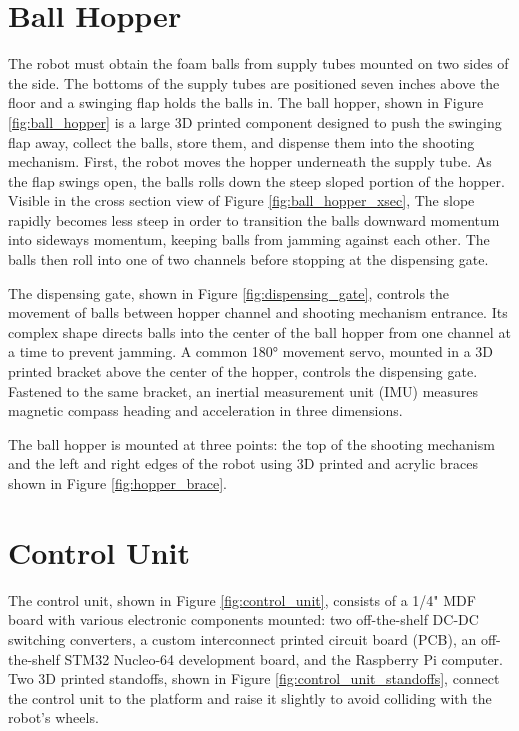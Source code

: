 \section{Ball Hopper}
The robot must obtain the foam balls from supply tubes mounted on two sides of the side. The bottoms of the supply tubes are positioned seven inches above the floor and a swinging flap holds the balls in. The ball hopper, shown in Figure \ref{fig:ball_hopper} is a large 3D printed component designed to push the swinging flap away, collect the balls, store them, and dispense them into the shooting mechanism. First, the robot moves the hopper underneath the supply tube. As the flap swings open, the balls rolls down the steep sloped portion of the hopper. Visible in the cross section view of Figure \ref{fig:ball_hopper_xsec}, The slope rapidly becomes less steep in order to transition the balls downward momentum into sideways momentum, keeping balls from jamming against each other. The balls then roll into one of two channels before stopping at the dispensing gate.

The dispensing gate, shown in Figure \ref{fig:dispensing_gate}, controls the movement of balls between hopper channel and shooting mechanism entrance. Its complex shape directs balls into the center of the ball hopper from one channel at a time to prevent jamming. A common \ang{180} movement servo, mounted in a 3D printed bracket above the center of the hopper, controls the dispensing gate. Fastened to the same bracket, an inertial measurement unit (IMU) measures magnetic compass heading and acceleration in three dimensions. 

The ball hopper is mounted at three points: the top of the shooting mechanism and the left and right edges of the robot using 3D printed and acrylic braces shown in Figure \ref{fig:hopper_brace}. 

\section{Control Unit}
The control unit, shown in Figure \ref{fig:control_unit}, consists of a 1/4" MDF board with various electronic components mounted: two off-the-shelf DC-DC switching converters, a custom interconnect printed circuit board (PCB), an off-the-shelf STM32 Nucleo-64 development board, and the Raspberry Pi computer. Two 3D printed standoffs, shown in Figure \ref{fig:control_unit_standoffs}, connect the control unit to the platform and raise it slightly to avoid colliding with the robot's wheels. 

